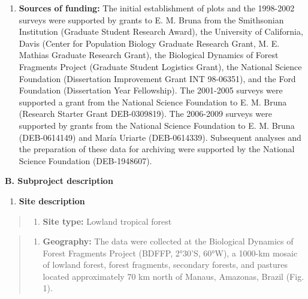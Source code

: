 \documentclass[
  12pt,
  man, donotrepeattitle,floatsintext]{apa6}
\providecommand{\tightlist}{%
  \setlength{\itemsep}{0pt}\setlength{\parskip}{0pt}}
\begin{document}
\begin{enumerate}
\item
  \textbf{Sources of funding:} The initial establishment of plots and the 1998-2002 surveys were supported by grants to E. M. Bruna from the Smithsonian Institution (Graduate Student Research Award), the University of California, Davis (Center for Population Biology Graduate Research Grant, M. E. Mathias Graduate Research Grant), the Biological Dynamics of Forest Fragments Project (Graduate Student Logistics Grant), the National Science Foundation (Dissertation Improvement Grant INT 98-06351), and the Ford Foundation (Dissertation Year Fellowship). The 2001-2005 surveys were supported a grant from the National Science Foundation to E. M. Bruna (Research Starter Grant DEB-0309819). The 2006-2009 surveys were supported by grants from the National Science Foundation to E. M. Bruna (DEB-0614149) and María Uriarte (DEB-0614339). Subsequent analyses and the preparation of these data for archiving were supported by the National Science Foundation (DEB-1948607).
\end{enumerate}

\noindent  
\textbf{B. Subproject description}

\begin{enumerate}
\def\labelenumi{\arabic{enumi}.}
\tightlist
\item
  \textbf{Site description}
\end{enumerate}

\begin{quote}
\begin{enumerate}
\def\labelenumi{\alph{enumi}.}
\tightlist
\item
  \textbf{Site type:} Lowland tropical forest
\end{enumerate}
\end{quote}

\begin{quote}
\begin{enumerate}
\def\labelenumi{\alph{enumi}.}
\setcounter{enumi}{1}
\tightlist
\item
  \textbf{Geography:} The data were collected at the Biological Dynamics of Forest Fragments Project (BDFFP, 2°30'S, 60°W), a 1000-km mosaic of lowland forest, forest fragments, secondary forests, and pastures located approximately 70 km north of Manaus, Amazonas, Brazil (Fig. 1).
\end{enumerate}
\end{quote}
\end{document}
